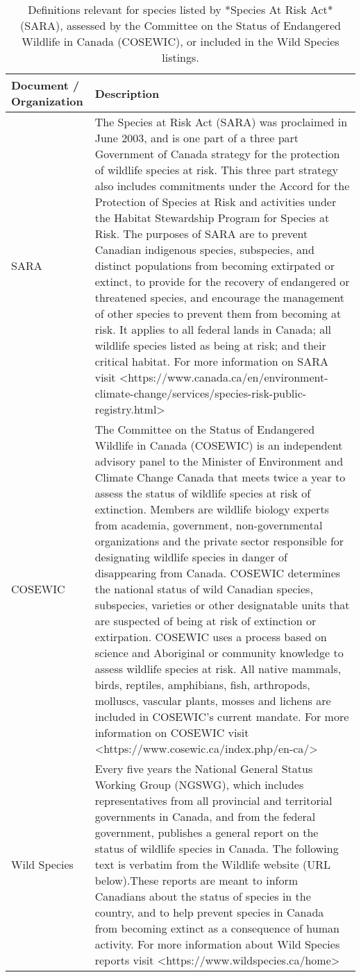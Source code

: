 \documentclass[
]{article}
\begin{document}
\begin{table}

\caption{\label{tab:unnamed-chunk-2}Definitions relevant for species listed by *Species At Risk Act* (SARA), assessed by the Committee on the Status of Endangered Wildlife in Canada (COSEWIC), or included in the Wild Species listings.}
\begin{tabular}[t]{l|l}
\hline
Document / Organization & Description\\
\hline
SARA & The Species at Risk Act (SARA) was proclaimed in June 2003, and is one part of a three part Government of Canada strategy for the protection of wildlife species at risk. This three part strategy also includes commitments under the Accord for the Protection of Species at Risk and activities under the Habitat Stewardship Program for Species at Risk. The purposes of SARA are to prevent Canadian indigenous species, subspecies, and distinct populations from becoming extirpated or extinct, to provide for the recovery of endangered or threatened species, and encourage the management of other species to prevent them from becoming at risk. It applies to all federal lands in Canada; all wildlife species listed as being at risk; and their critical habitat. For more information on SARA visit <https://www.canada.ca/en/environment-climate-change/services/species-risk-public-registry.html>\\
\hline
COSEWIC & The Committee on the Status of Endangered Wildlife in Canada (COSEWIC) is an independent advisory panel to the Minister of Environment and Climate Change Canada that meets twice a year to assess the status of wildlife species at risk of extinction. Members are wildlife biology experts from academia, government, non-governmental organizations and the private sector responsible for designating wildlife species in danger of disappearing from Canada. COSEWIC determines the national status of wild Canadian species, subspecies, varieties or other designatable units that are suspected of being at risk of extinction or extirpation. COSEWIC uses a process based on science and Aboriginal or community knowledge to assess wildlife species at risk. All native mammals, birds, reptiles, amphibians, fish, arthropods, molluscs, vascular plants, mosses and lichens are included in COSEWIC's current mandate.
For more information on COSEWIC visit <https://www.cosewic.ca/index.php/en-ca/>\\
\hline
Wild Species & Every five years the National General Status Working Group (NGSWG), which includes representatives from all provincial and territorial governments in Canada, and from the federal government, publishes a general report on the status of wildlife species in Canada. 
The following text is verbatim from the Wildlife website (URL below).These reports are meant to inform Canadians about the status of species in the country, and to help prevent species in Canada from becoming extinct as a consequence of human activity.
For more information about Wild Species reports visit <https://www.wildspecies.ca/home>\\
\hline
\end{tabular}
\end{table}
\end{document}
